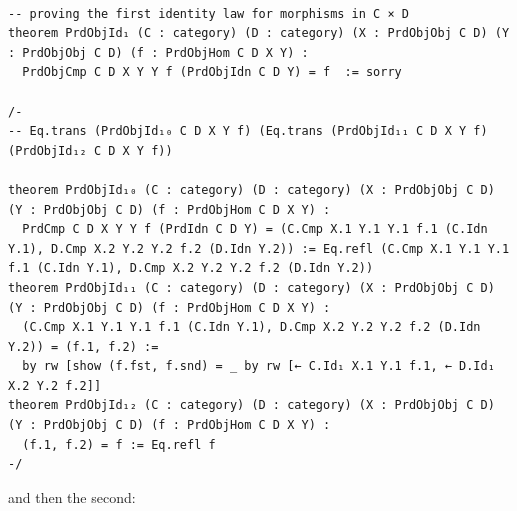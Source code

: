 \documentclass{book}
\newcounter{lcounter}
\begin{document}
\begin{center}
\begin{tcolorbox}[width=5in,colback={white},title={\begin{center}\texttt{Lean \thelcounter} \addtocounter{lcounter}{1}  \end{center}},colbacktitle=Blue,coltitle=black]
\begin{verbatim}

-- proving the first identity law for morphisms in C × D 
theorem PrdObjId₁ (C : category) (D : category) (X : PrdObjObj C D) (Y : PrdObjObj C D) (f : PrdObjHom C D X Y) :
  PrdObjCmp C D X Y Y f (PrdObjIdn C D Y) = f  := sorry

/-
-- Eq.trans (PrdObjId₁₀ C D X Y f) (Eq.trans (PrdObjId₁₁ C D X Y f) (PrdObjId₁₂ C D X Y f))

theorem PrdObjId₁₀ (C : category) (D : category) (X : PrdObjObj C D) (Y : PrdObjObj C D) (f : PrdObjHom C D X Y) :
  PrdCmp C D X Y Y f (PrdIdn C D Y) = (C.Cmp X.1 Y.1 Y.1 f.1 (C.Idn Y.1), D.Cmp X.2 Y.2 Y.2 f.2 (D.Idn Y.2)) := Eq.refl (C.Cmp X.1 Y.1 Y.1 f.1 (C.Idn Y.1), D.Cmp X.2 Y.2 Y.2 f.2 (D.Idn Y.2))
theorem PrdObjId₁₁ (C : category) (D : category) (X : PrdObjObj C D) (Y : PrdObjObj C D) (f : PrdObjHom C D X Y) :
  (C.Cmp X.1 Y.1 Y.1 f.1 (C.Idn Y.1), D.Cmp X.2 Y.2 Y.2 f.2 (D.Idn Y.2)) = (f.1, f.2) :=
  by rw [show (f.fst, f.snd) = _ by rw [← C.Id₁ X.1 Y.1 f.1, ← D.Id₁ X.2 Y.2 f.2]]
theorem PrdObjId₁₂ (C : category) (D : category) (X : PrdObjObj C D) (Y : PrdObjObj C D) (f : PrdObjHom C D X Y) :
  (f.1, f.2) = f := Eq.refl f
-/

\end{verbatim}%
\end{tcolorbox}
\end{center}

and then the second:
\end{document}
